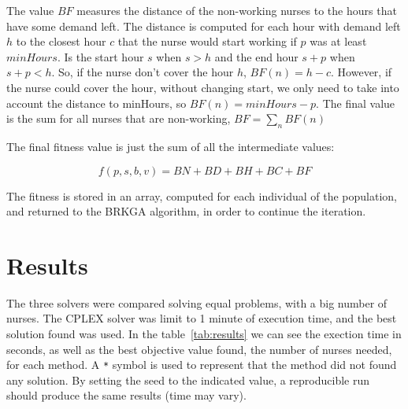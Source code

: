 \documentclass[12pt,a4paper]{article}
\begin{document}
The value $BF$ measures the distance of the non-working nurses to the hours that 
have some demand left. The distance is computed for each hour with demand left 
$h$ to the closest hour $c$ that the nurse would start working if $p$ was at 
least $minHours$. Is the start hour $s$ when $s > h$ and the end hour $s+p$ when 
$s+p < h$. So, if the nurse don't cover the hour $h$, $BF(n) = h - c$. However, 
if the nurse could cover the hour, without changing start, we only need to take 
into account the distance to minHours, so $BF(n) = minHours - p$. The final 
value is the sum for all nurses that are non-working, $BF = \sum_n BF(n)$

The final fitness value is just the sum of all the intermediate values:

$$ f(p,s,b,v) = BN + BD + BH + BC + BF $$

The fitness is stored in an array, computed for each individual of the 
population, and returned to the BRKGA algorithm, in order to continue the 
iteration.

\section{Results}

The three solvers were compared solving equal problems, with a big number of 
nurses. The CPLEX solver was limit to 1 minute of execution time, and the best 
solution found was used. In the table~\ref{tab:results} we can see the exection 
time in seconds, as well as the best objective value found, the number of nurses 
needed, for each method. A \texttt{*} symbol is used to represent that the 
method did not found any solution. By setting the seed to the indicated value, a 
reproducible run should produce the same results (time may vary).
\end{document}
